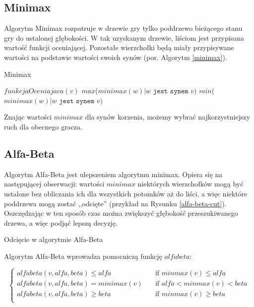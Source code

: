 \documentclass{pracamgr}
\begin{document}
\subsection{Minimax}

Algorytm Minimax rozpatruje w drzewie gry tylko poddrzewo bieżącego stanu gry do ustalonej głębokości. W tak uzyskanym drzewie, liściom jest przypisana wartość funkcji oceniającej.
Pozostałe wierzchołki będą miały przypisywane wartości na podstawie wartości swoich synów (por. Algorytm \ref{minimax}).

\begin{algorytm}
\caption{Minimax\label{minimax}}
\begin{algorithmic}[1]
	\State \Return $funkcjaOceniajaca(v)$
\EndIf
{}
    \State \Return $max$($minimax(w) | \texttt{\(w\) jest synem \(v\)})$
\Else
    \State \Return $min$($minimax(w) | \texttt{\(w\) jest synem \(v\)})$
\EndIf
\EndFunction
\end{algorithmic}
\end{algorytm}

Znając wartości \(minimax\) dla synów korzenia, możemy wybrać najkorzystniejszy ruch dla obecnego gracza.

\subsection{Alfa-Beta}

Algorytm Alfa-Beta jest ulepszeniem algorytmu minimax.
Opiera się na następującej obserwacji: wartości \(minimax\) niektórych wierzchołków mogą być ustalone bez obliczania ich dla wszystkich potomków aż do liści, a więc niektóre poddrzewa mogą zostać ,,odcięte'' (przykład na Rysunku \ref{alfa-beta-cut}).
Oszczędzając w ten sposób czas można zwiększyć głębokość przeszukiwanego drzewa, a więc podjąć lepszą decyzję.

\begin{rysunek}
\caption{Odcięcie w algorytmie Alfa-Beta \label{alfa-beta-cut}}
\centering

\end{rysunek}

Algorytm Alfa-Beta wprowadza pomocniczą funkcję \(alfabeta\):

\[
  \begin{cases}
    alfabeta(v, alfa, beta) \leq alfa    & \quad \text{if } minmax(v) \leq alfa\\
    alfabeta(v, alfa, beta) = minimax(v) & \quad \text{if } alfa < minmax(v) < beta \\
    alfabeta(v, alfa, beta) \geq beta    & \quad \text{if } minmax(v) \geq beta \\
  \end{cases}
\]
\end{document}
